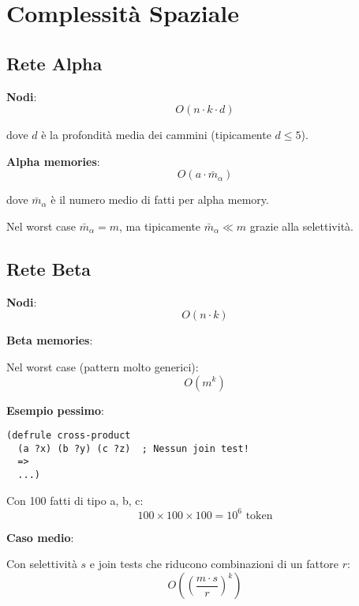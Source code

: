 \section{Complessità Spaziale}

\subsection{Rete Alpha}

\textbf{Nodi}:
\begin{equation}
O(n \cdot k \cdot d)
\end{equation}

dove $d$ è la profondità media dei cammini (tipicamente $d \leq 5$).

\textbf{Alpha memories}:
\begin{equation}
O(a \cdot \bar{m}_\alpha)
\end{equation}

dove $\bar{m}_\alpha$ è il numero medio di fatti per alpha memory.

Nel worst case $\bar{m}_\alpha = m$, ma tipicamente $\bar{m}_\alpha \ll m$ grazie alla selettività.

\subsection{Rete Beta}

\textbf{Nodi}:
\begin{equation}
O(n \cdot k)
\end{equation}

\textbf{Beta memories}:

Nel worst case (pattern molto generici):
\begin{equation}
O(m^k)
\end{equation}

\textbf{Esempio pessimo}:
\begin{lstlisting}[language=CLIPS]
(defrule cross-product
  (a ?x) (b ?y) (c ?z)  ; Nessun join test!
  =>
  ...)
\end{lstlisting}

Con 100 fatti di tipo a, b, c:
\begin{equation}
100 \times 100 \times 100 = 10^6 \text{ token}
\end{equation}

\textbf{Caso medio}:

Con selettività $s$ e join tests che riducono combinazioni di un fattore $r$:
\begin{equation}
O\left(\left(\frac{m \cdot s}{r}\right)^k\right)
\end{equation}

